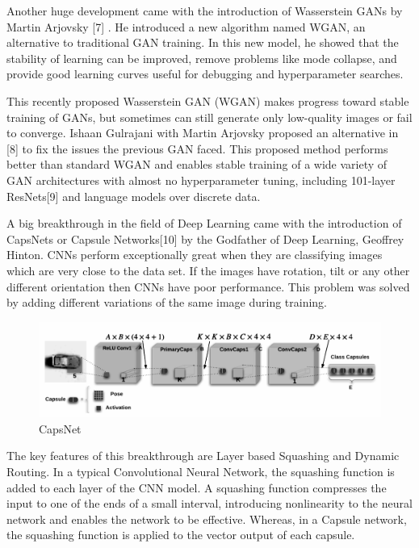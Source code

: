 Another huge development came with the introduction of Wasserstein GANs by Martin Arjovsky [7] . He introduced a new algorithm named WGAN, an alternative to traditional GAN training. In this new model, he showed that the stability of learning can be improved, remove problems like mode collapse, and provide good learning curves useful for debugging and hyperparameter searches.\par\bigskip
This recently proposed Wasserstein GAN (WGAN) makes progress toward stable training of GANs, but sometimes can still generate only low-quality images or fail to converge. 
Ishaan Gulrajani with Martin Arjovsky proposed an alternative in [8] to fix the issues the previous GAN faced. This proposed method performs better than standard WGAN and enables stable training of a wide variety of GAN architectures with almost no hyperparameter tuning, including 101-layer ResNets[9] and language models over discrete data.\par\bigskip
A big breakthrough in the field of Deep Learning came with the introduction of CapsNets or Capsule Networks[10] by the Godfather of Deep Learning, Geoffrey Hinton. CNNs perform exceptionally great when they are classifying images which are very close to the data set. If the images have rotation, tilt or any other different orientation then CNNs have poor performance. This problem was solved by adding different variations of the same image during training.\par\bigskip
\bigskip
\begin{figure}[H]
\centering\includegraphics[width=1\textwidth]{images/caps.png}
\caption{CapsNet}
\end{figure}
The key features of this breakthrough are Layer based Squashing and Dynamic Routing.
In a typical Convolutional Neural Network, the squashing function is added to each layer of the CNN model. A squashing function compresses the input to one of the ends of a small interval, introducing nonlinearity to the neural network and enables the network to be effective. Whereas, in a Capsule network, the squashing function is applied to the vector output of each capsule.\par\bigskip
